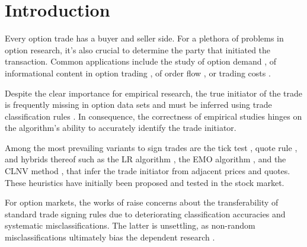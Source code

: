 \section{Introduction}\label{sec:introduction}

Every option trade has a buyer and seller side. For a plethora of problems in option research, it’s also crucial to determine the party that initiated the transaction. Common applications include the study of option demand \autocite[\checkmark][4261]{garleanuDemandBasedOptionPricing2009}, of informational content in option trading \autocites[\checkmark][631]{huDoesOptionTrading2014}[\checkmark][882]{panInformationOptionVolume2006}[\checkmark][1079]{caoInformationalContentOption2005}, of order flow \autocite[\checkmark][684]{muravyevOrderFlowExpected2016}, or trading costs \autocite[\checkmark][4980]{muravyevOptionsTradingCosts2020}. 

Despite the clear importance for empirical research, the true initiator of the trade is frequently missing in option data sets and must be inferred using trade classification rules \autocite[\checkmark][453]{easleyOptionVolumeStock1998}. In consequence, the correctness of empirical studies hinges on the algorithm's ability to accurately identify the trade initiator.

Among the most prevailing variants to sign trades are the tick test \autocite[\checkmark][240]{hasbrouckTradesQuotesInventories1988}, quote rule \autocite[\checkmark][41]{harrisDayEndTransactionPrice1989}, and hybrids thereof such as the \gls{LR} algorithm \autocite[\checkmark][745]{leeInferringTradeDirection1991}, the \gls{EMO} algorithm \autocite[\checkmark][536]{ellisAccuracyTradeClassification2000}, and the \gls{CLNV} method \autocite[\checkmark][3812]{chakrabartyTradeClassificationAlgorithms2007}, that infer the trade initiator from adjacent prices and quotes. These heuristics have initially been proposed and tested in the stock market.

For option markets, the works of \textcites[\checkmark][11--13]{grauerOptionTradeClassification2022}[\checkmark][887--891]{savickasInferringDirectionOption2003} raise concerns about the transferability of standard trade signing rules due to deteriorating classification accuracies and systematic misclassifications. The latter is unsettling, as non-random misclassifications ultimately bias the dependent research \autocites[\checkmark][260]{odders-whiteOccurrenceConsequencesInaccurate2000}[\checkmark][157]{theissenTestAccuracyLee2001}.


